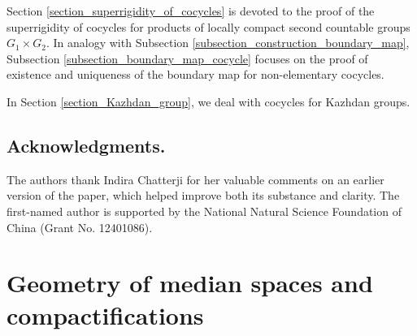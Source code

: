 \documentclass{amsart}
\numberwithin{equation}{section}
\theoremstyle{definition}
\begin{document}
Section \ref{section_superrigidity_of_cocycles} is devoted to the proof of the superrigidity of cocycles for products of locally compact second countable groups $G_1 \times G_2$. In analogy with Subsection \ref{subsection_construction_boundary_map}, Subsection \ref{subsection_boundary_map_cocycle} focuses on the proof of existence and uniqueness of the boundary map for non-elementary cocycles.\par
In Section \ref{section_Kazhdan_group}, we deal with cocycles for Kazhdan groups.
\subsection*{Acknowledgments.}  
The authors thank Indira Chatterji for her valuable comments on an earlier version of the paper, which helped improve both its substance and clarity. The first-named author is supported by the National Natural Science Foundation of China (Grant No. 12401086).
\section{Geometry of median spaces and compactifications}\label{Section_median_geometry}



\end{document}
